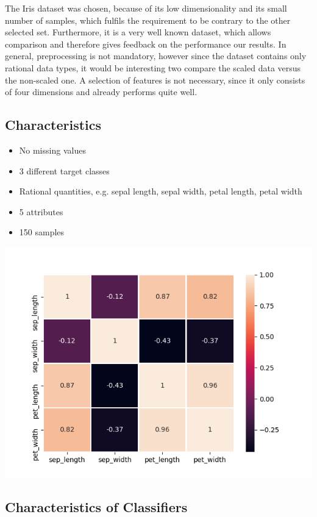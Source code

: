\documentclass{article}
\begin{document}
The Iris dataset was chosen, because of its low dimensionality and its small number of samples, which fulfils the requirement to be contrary to the other selected set. Furthermore, it is a very well known dataset, which allows comparison and therefore gives feedback on the performance our results. In general, preprocessing is not mandatory, however since the dataset contains only rational data types, it would be interesting two compare the scaled data versus the non-scaled one. A selection of features is not necessary, since it only consists of four dimensions and already performs quite well.

\subsection{Characteristics}

\begin{itemize}
\item No missing values
\item 3 different target classes
\item Rational quantities, e.g. sepal length, sepal width, petal length, petal width
\item 5 attributes
\item 150 samples
\end{itemize}

\includegraphics[width=\textwidth]{plots/heatmap.png}

\subsection{Characteristics of Classifiers}
\end{document}
